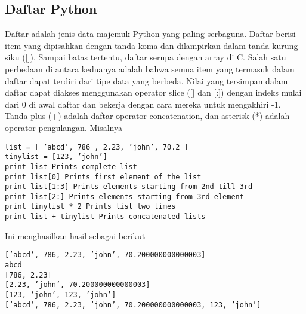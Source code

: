\begin{enumerate}
\subsection{Daftar Python}
Daftar adalah jenis data majemuk Python yang paling serbaguna. Daftar berisi item
yang dipisahkan dengan tanda koma dan dilampirkan dalam tanda kurung siku ([]).
Sampai batas tertentu, daftar serupa dengan array di C. Salah satu perbedaan di antara
keduanya adalah bahwa semua item yang termasuk dalam daftar dapat terdiri dari
tipe data yang berbeda.
Nilai yang tersimpan dalam daftar dapat diakses menggunakan operator slice ([] dan
[:]) dengan indeks mulai dari 0 di awal daftar dan bekerja dengan cara mereka untuk
mengakhiri -1. Tanda plus (+) adalah daftar operator concatenation, dan asterisk (*)
adalah operator pengulangan. Misalnya
\begin{verbatim}
list = [ ’abcd’, 786 , 2.23, ’john’, 70.2 ]
tinylist = [123, ’john’]
print list Prints complete list
print list[0] Prints first element of the list
print list[1:3] Prints elements starting from 2nd till 3rd
print list[2:] Prints elements starting from 3rd element
print tinylist * 2 Prints list two times
print list + tinylist Prints concatenated lists
\end{verbatim}
Ini menghasilkan hasil sebagai berikut 
\begin{verbatim}
[’abcd’, 786, 2.23, ’john’, 70.200000000000003]
abcd
[786, 2.23]
[2.23, ’john’, 70.200000000000003]
[123, ’john’, 123, ’john’]
[’abcd’, 786, 2.23, ’john’, 70.200000000000003, 123, ’john’]
\end{verbatim}


\end{enumerate}
